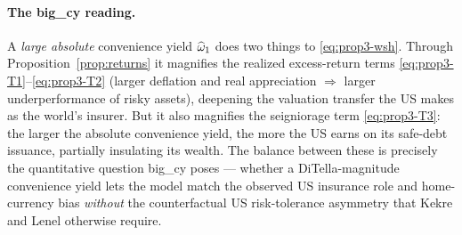 \paragraph{The big\_cy reading.} A \emph{large absolute} convenience yield
$\widehat{\omega}_1$ does two things to \eqref{eq:prop3-wsh}. Through
Proposition~\ref{prop:returns} it magnifies the realized excess-return terms
\eqref{eq:prop3-T1}--\eqref{eq:prop3-T2} (larger deflation and real appreciation
$\Rightarrow$ larger underperformance of risky assets), deepening the valuation
transfer the US makes as the world's insurer. But it also magnifies the
seigniorage term \eqref{eq:prop3-T3}: the larger the absolute convenience yield,
the more the US earns on its safe-debt issuance, partially insulating its wealth.
The balance between these is precisely the quantitative question big\_cy poses ---
whether a DiTella-magnitude convenience yield lets the model match the observed
US insurance role and home-currency bias \emph{without} the counterfactual US
risk-tolerance asymmetry that Kekre and Lenel otherwise require.
